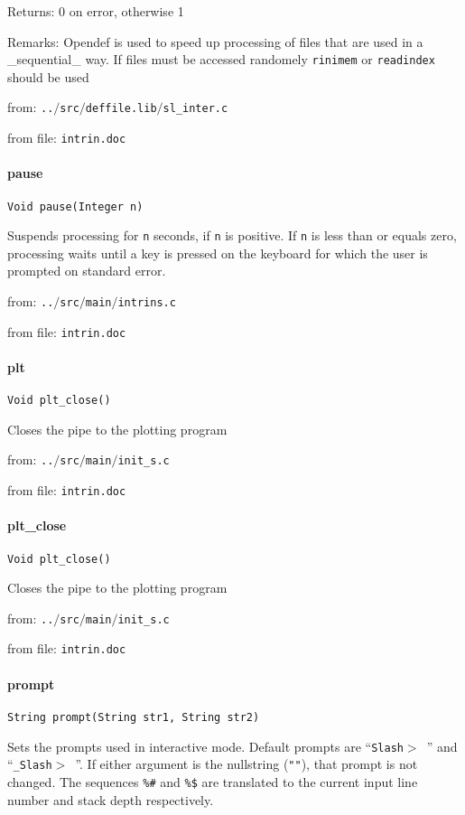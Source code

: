 Returns: 0 on error, otherwise 1


Remarks: Opendef is used to speed up processing of files that are used
in a \_sequential\_ way. If files must be accessed randomely {\tt rinimem}
or {\tt readindex} should be used


from: {\tt ..$/$src$/$deffile.lib$/$sl\_inter.c}

from file: {\tt intrin.doc}


\paragraph{pause}
\begin{verbatim}
Void pause(Integer n)
\end{verbatim}
Suspends processing for {\tt n} seconds, if {\tt n} is positive. If
{\tt n} is less than or equals zero, processing waits until a key
is pressed on the keyboard for which the user is prompted on
standard error.


from: {\tt ..$/$src$/$main$/$intrins.c}

from file: {\tt intrin.doc}


\paragraph{plt}
\begin{verbatim}
Void plt_close()
\end{verbatim}
Closes the pipe to the plotting program


from: {\tt ..$/$src$/$main$/$init\_s.c}

from file: {\tt intrin.doc}


\paragraph{plt\_close}
\begin{verbatim}
Void plt_close()
\end{verbatim}
Closes the pipe to the plotting program


from: {\tt ..$/$src$/$main$/$init\_s.c}

from file: {\tt intrin.doc}


\paragraph{prompt}
\begin{verbatim}
String prompt(String str1, String str2)
\end{verbatim}
Sets the prompts used in interactive mode. Default prompts
are ``{\tt Slash$>$ }'' and ``{\tt \_Slash$>$ }''. If either argument
is the nullstring ({\tt ""}), that prompt is not changed. The
sequences {\tt \%\#} and {\tt \%\$} are translated to the current input
line number and stack depth respectively.


